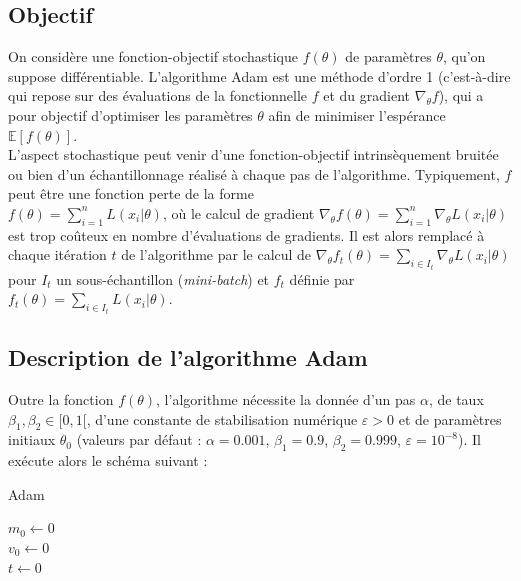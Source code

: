 \documentclass[11pt,a4paper, french]{article}
\newcommand{\dsum}[2]{\displaystyle\sum_{#1}^{#2}}
\theoremstyle{definition}
\begin{document}
\subsection{Objectif}
On considère une fonction-objectif stochastique $f(\theta)$ de paramètres $\theta$, qu'on suppose différentiable. L'algorithme Adam est une méthode d'ordre 1 (c'est-à-dire qui repose sur des évaluations de la fonctionnelle $f$ et du gradient $\nabla_{\theta}f$), qui a pour objectif d'optimiser les paramètres $\theta$ afin de minimiser l'espérance $\mathbb E[f(\theta)]$. \\
L'aspect stochastique peut venir d'une fonction-objectif intrinsèquement bruitée ou bien d'un échantillonnage réalisé à chaque pas de l'algorithme. Typiquement, $f$ peut être une fonction perte de la forme \\$f(\theta)=\dsum{i=1}nL(x_i|\theta)$, où le calcul de gradient $\nabla_{\theta}f(\theta)=\dsum{i=1}n\nabla_{\theta}L(x_i|\theta)$ est trop coûteux en nombre d'évaluations de gradients. Il est alors remplacé à chaque itération $t$ de l'algorithme par le calcul de $\nabla_{\theta}f_t(\theta)=\dsum{i\in I_t}{}\nabla_{\theta}L(x_i|\theta)$ pour $I_t$ un sous-échantillon (\textit{mini-batch}) et $f_t$ définie par $f_t(\theta)=\dsum{i\in I_t}{}L(x_i|\theta)$.

\subsection{Description de l'algorithme Adam}

Outre la fonction $f(\theta)$, l'algorithme nécessite la donnée d'un pas $\alpha$, de taux $\beta_1,\beta_2\in[0,1[$, d'une constante de stabilisation numérique $\varepsilon>0$ et de paramètres initiaux $\theta_0$ (valeurs par défaut : $\alpha=0.001$, $\beta_1=0.9$, $\beta_2=0.999$, $\varepsilon=10^{-8}$). Il exécute alors le schéma suivant :


\begin{algorithm}
  \caption{Adam}
  $m_0\longleftarrow 0$ \\
  $v_0\longleftarrow 0$ \\  
  $t\longleftarrow 0$ \\
\end{algorithm}
\end{document}
